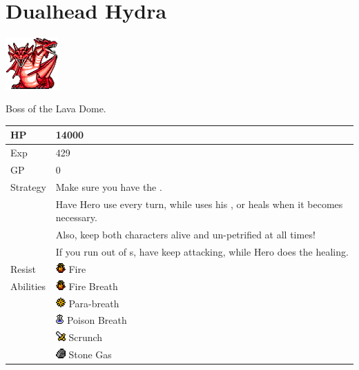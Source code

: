 \section{Dualhead Hydra}
\label{monster:dualhead_hydra}

\includegraphics[height=2cm,keepaspectratio]{./resources/monster/dualhead_hydra}

Boss of the Lava Dome.

\begin{longtable}{ l p{9cm} }
	HP
	& 14000
\\ \hline
	Exp
	& 429
\\ \hline
	GP
	& 0
\\ \hline
	Strategy
	& Make sure you have the \nameref{armor:moon_helm}. \\
	& Have Hero use \nameref{spell:white} every turn, while \nameref{char:reuben} uses his \nameref{weapon:morning_star}, or heals when it becomes necessary. \\
	& Also, keep both characters alive and un-petrified at all times! \\
	& If you run out of \nameref{item:seed}s, have \nameref{char:reuben} keep attacking, while Hero does the healing.
\\ \hline
	Resist
	& \includegraphics[height=1em,keepaspectratio]{./resources/effects/fire} Fire
\\ \hline
	Abilities
	& \includegraphics[height=1em,keepaspectratio]{./resources/effects/fire} Fire Breath \\
	& \includegraphics[height=1em,keepaspectratio]{./resources/effects/paralyze} Para-breath \\
	& \includegraphics[height=1em,keepaspectratio]{./resources/effects/poison} Poison Breath \\
	& \includegraphics[height=1em,keepaspectratio]{./resources/effects/damage} Scrunch \\
	& \includegraphics[height=1em,keepaspectratio]{./resources/effects/petrify} Stone Gas
\end{longtable}
